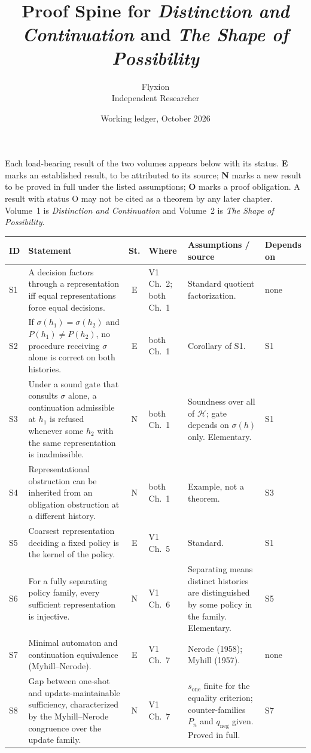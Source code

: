 \documentclass[10pt]{article}
\title{Proof Spine for \emph{Distinction and Continuation} and \emph{The Shape of Possibility}}
\author{Flyxion\\Independent Researcher}
\date{Working ledger, October 2026}
\newcommand{\Hist}{\mathcal{H}}
\newcommand{\rep}{\sigma}
\begin{document}
\maketitle

\noindent Each load-bearing result of the two volumes appears below with its status. \textbf{E} marks an established result, to be attributed to its source; \textbf{N} marks a new result to be proved in full under the listed assumptions; \textbf{O} marks a proof obligation. A result with status O may not be cited as a theorem by any later chapter. Volume~1 is \emph{Distinction and Continuation} and Volume~2 is \emph{The Shape of Possibility}.

\small
\begin{longtable}{@{}l p{} c l p{} p{}@{}}
\toprule
\textbf{ID} & \textbf{Statement} & \textbf{St.} & \textbf{Where} & \textbf{Assumptions / source} & \textbf{Depends on}\\
\midrule
\endhead
S1 & A decision factors through a representation iff equal representations force equal decisions. & E & V1 Ch.~2; both Ch.~1 & Standard quotient factorization. & none\\[3pt]
S2 & If $\rep(h_1)=\rep(h_2)$ and $P(h_1)\ne P(h_2)$, no procedure receiving $\rep$ alone is correct on both histories. & E & both Ch.~1 & Corollary of S1. & S1\\[3pt]
S3 & Under a sound gate that consults $\rep$ alone, a continuation admissible at $h_1$ is refused whenever some $h_2$ with the same representation is inadmissible. & N & both Ch.~1 & Soundness over all of $\Hist$; gate depends on $\rep(h)$ only. Elementary. & S1\\[3pt]
S4 & Representational obstruction can be inherited from an obligation obstruction at a different history. & N & both Ch.~1 & Example, not a theorem. & S3\\[3pt]
S5 & Coarsest representation deciding a fixed policy is the kernel of the policy. & E & V1 Ch.~5 & Standard. & S1\\[3pt]
S6 & For a fully separating policy family, every sufficient representation is injective. & N & V1 Ch.~6 & Separating means distinct histories are distinguished by some policy in the family. Elementary. & S5\\[3pt]
S7 & Minimal automaton and continuation equivalence (Myhill--Nerode). & E & V1 Ch.~7 & Nerode (1958); Myhill (1957). & none\\[3pt]
S8 & Gap between one-shot and update-maintainable sufficiency, characterized by the Myhill--Nerode congruence over the update family. & N & V1 Ch.~7 & $s_{\mathrm{one}}$ finite for the equality criterion; counter-families $P_n$ and $q_{\mathrm{neg}}$ given. Proved in full. & S7\\[3pt]

\end{longtable}
\end{document}
